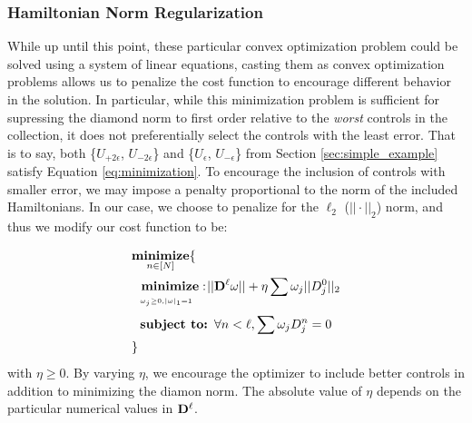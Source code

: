 \documentclass[aps,nofootinbib,pra,notitlepage,twocolumn]{revtex4-1}
\begin{document}


\subsubsection{Hamiltonian Norm Regularization}
\label{sec:norm}
While up until this point, these particular convex optimization problem could be solved using a system of linear equations, casting them as convex optimization problems allows us to penalize the cost function to encourage different behavior in the solution. In particular, while this minimization problem is sufficient for supressing the diamond norm to first order relative to the \textit{worst} controls in the collection, it does not preferentially select the controls with the least error. That is to say, both \{$U_{+2\epsilon}$, $U_{-2\epsilon}$\} and \{$U_{\epsilon}$, $U_{-\epsilon}$\} from Section \ref{sec:simple_example} satisfy Equation \ref{eq:minimization}. To encourage the inclusion of controls with smaller error, we may impose a penalty proportional to the norm of the included Hamiltonians. In our case, we choose to penalize for the $\ell_2$ ($||\cdot||_2$) norm, and thus we modify our cost function to be:

\newcommand{\bunderbrace}[2]{%
  \begin{array}[t]{@{}c@{}}
  #1\\
  \parbox{\widthof{#1}}{$\scriptscriptstyle#2$}
  \end{array}
}

\begin{equation}\label{eq:minimization_l2}
\begin{split}
&\underset{n\in[N]}{\textbf{minimize}}\{\\
&\ \ \bunderbrace{\textbf{minimize}: }{\omega_j\geq0, |\omega|_1=1} ||{\bold{D}^{\ell}}\omega||+ \eta\sum\omega_j||D^0_j||_2\\
&\ \ \textbf{subject to: } \forall n<\ell, \sum \omega_jD_j^n=0\\
&\}
\end{split}
\end{equation}
with $\eta \geq 0$. By varying $\eta$, we encourage the optimizer to include better controls in addition to minimizing the diamon norm. The absolute value of $\eta$ depends on the particular numerical values in $\bold{D}^\ell$.
\end{document}
